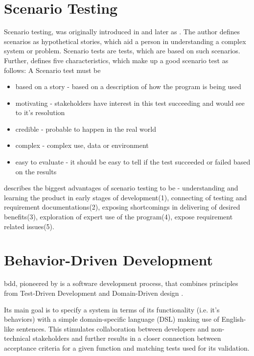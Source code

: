\section{Scenario Testing}
Scenario testing, was originally introduced in \textcite{kaner2003power} and later as \textcite{kaner2013introduction}. The author defines scenarios as hypothetical stories, which aid a person in understanding a complex system or problem. Scenario tests are tests, which are based on such scenarios.  \parencite[1]{kaner2013introduction}
Further, \parencite[2-5]{kaner2003power} defines five characteristics, which make up a good scenario test as follows:
A Scenario test must be
\begin{itemize}
     \item based on a story - based on a description of how the program is being used
    \item motivating - stakeholders have interest in this test succeeding and would see to it's resolution
    \item credible - probable to happen in the real world
    \item complex - complex use, data or environment
    \item easy to evaluate - it should be easy to tell if the test succeeded or failed based on the results 
\end{itemize}

\textcite{kaner2013introduction} describes the biggest advantages of scenario testing to be  - understanding and learning the product in early stages of development(1), connecting of testing and requirement documentations(2), exposing shortcomings in delivering of desired benefits(3), exploration of expert use of the program(4), expose requirement related issues(5).

\section{Behavior-Driven Development}
\label{fundamentals:bdd}
\gls{bdd}, pioneered by \textcite{north2006behavior} is a software development
process, that combines principles from Test-Driven Development and Domain-Driven design \parencite{evans2004domain}.

Its main goal is to specify a system in terms of its functionality (i.e. it's behaviors) with a simple domain-specific language (DSL) making use of English-like sentences. This stimulates collaboration between developers and non-technical stakeholders and further results in a closer connection between acceptance criteria for a given function and matching tests used for its validation.

